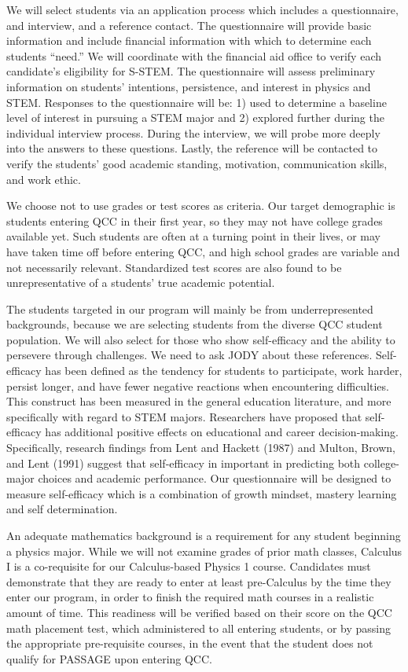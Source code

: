 \documentclass[12pt]{article}
\newcommand\new[1]{{\color{blue}#1}}
\begin{document}
We will select students via an application process which includes a questionnaire, and interview, and a reference contact.  The questionnaire will provide basic information and include financial information with which to determine each students ``need.''  We will coordinate with the financial aid office to verify each candidate's eligibility for S-STEM.  The questionnaire will assess preliminary information on students' intentions, persistence, and interest in physics and STEM. Responses to the questionnaire will be: 1) used to determine a baseline level of interest in pursuing a STEM major and 2) explored further during the individual interview process.  During the interview, we will probe more deeply into the answers to these questions.  Lastly, the reference will be contacted to verify the students' good academic standing, motivation, communication skills, and work ethic.

We choose not to use grades or test scores as criteria.  Our target demographic is students entering QCC in their first year, so they may not have college grades available yet.  Such students are often at a turning point in their lives, or may have taken time off before entering QCC, and high school grades are variable and not necessarily relevant.  Standardized test scores are also found to be unrepresentative of a students' true academic potential.

The students targeted in our program will mainly be from underrepresented backgrounds, because we are selecting students from the diverse QCC  student population.  We will also select for those who show self-efficacy and the ability to persevere through challenges.  \new{We need to ask JODY about these references.}  Self-efficacy has been defined as the tendency for students to participate, work harder, persist longer, and have fewer negative reactions when encountering difficulties.  This construct has been measured in the general education literature, and more specifically with regard to STEM majors. Researchers have proposed that self-efficacy has additional positive effects on educational and career decision-making.  Specifically, research findings from Lent and Hackett (1987)  and Multon, Brown, and Lent (1991) suggest that self-efficacy in important in predicting both college-major choices and academic performance. Our questionnaire will be designed to measure self-efficacy which is a combination of growth mindset, mastery learning and self determination.   

An adequate mathematics background is a requirement for any student beginning a physics major.  While we will not examine grades of prior math classes, Calculus I is a co-requisite for our Calculus-based Physics 1 course.  Candidates must demonstrate that they are ready to enter at least pre-Calculus by the time they enter our program, in order to finish the required math courses in a realistic amount of time.  This readiness will be verified based on their score on the QCC math placement test, which administered to all entering students, or by passing the appropriate pre-requisite courses, in the event that the student does not qualify for PASSAGE upon entering QCC. 
\end{document}
